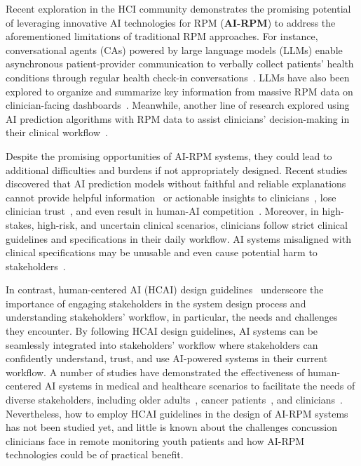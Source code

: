 Recent exploration in the HCI community demonstrates the promising potential of leveraging innovative AI technologies for RPM (\textbf{AI-RPM}) to address the aforementioned limitations of traditional RPM approaches. 
For instance, conversational agents (CAs) powered by large language models (LLMs) enable asynchronous patient-provider communication to verbally collect patients' health conditions through regular health check-in conversations~\cite{yang2024talk2care}. 
LLMs have also been explored to organize and summarize key information from massive RPM data on clinician-facing dashboards~\cite{wu2024cardioai}.
Meanwhile, another line of research explored using AI prediction algorithms with RPM data to assist clinicians' decision-making in their clinical workflow~\cite{yin2024sepsislab}.





Despite the promising opportunities of AI-RPM systems, they could lead to additional difficulties and burdens if not appropriately designed.
Recent studies discovered that AI prediction models without faithful and reliable explanations cannot provide helpful information~\cite{antoniadi2021current} or actionable insights to clinicians~\cite{rane2023explainable, zhang2024rethinking}, lose clinician trust~\cite{zhang2020effect, chanda2024dermatologist}, and even result in human-AI competition~\cite{zhang2024rethinking}.
Moreover, in high-stakes, high-risk, and uncertain clinical scenarios, clinicians follow strict clinical guidelines and specifications in their daily workflow. 
AI systems misaligned with clinical specifications may be unusable and even cause potential harm to stakeholders~\cite{romero2020lesson}.



In contrast, human-centered AI (HCAI) design guidelines~\cite{shneiderman2022human, wang2023human} underscore the importance of engaging stakeholders in the system design process and understanding stakeholders' workflow, in particular, the needs and challenges they encounter.
By following HCAI design guidelines, AI systems can be seamlessly integrated into stakeholders' workflow where stakeholders can confidently understand, trust, and use AI-powered systems in their current workflow. 
A number of studies have demonstrated the effectiveness of human-centered AI systems in medical and healthcare scenarios to facilitate the needs of diverse stakeholders, including older adults~\cite{hao2024advancing}, cancer patients~\cite{wu2024cardioai}, and clinicians~\cite{wang2023human,fogliato2022goes,yang2019unremarkable,zhang2024rethinking}.
Nevertheless, how to employ HCAI guidelines in the design of AI-RPM systems has not been studied yet, and little is known about the challenges concussion clinicians face in remote monitoring youth patients and how AI-RPM technologies could be of practical benefit.



